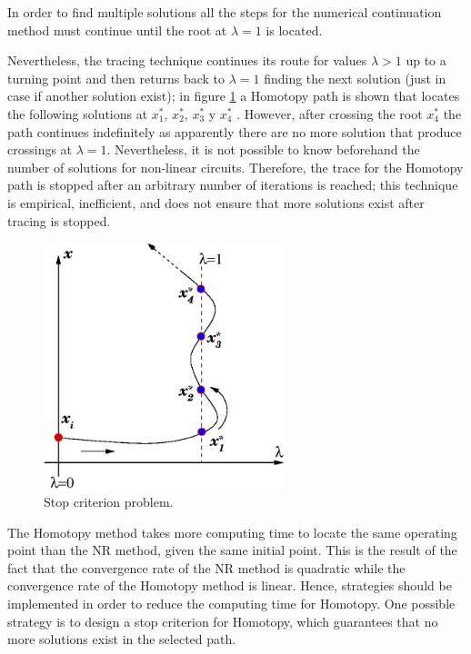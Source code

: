 \documentclass[conference,letterpaper,onecolumn]{IEEEtran}
\begin{document}
In order to find multiple solutions all the steps for the numerical continuation method \cite{homo_iberchip03,homo_allgower,homo_allgower2} must continue until the root at  $\lambda=1$ is located.

Nevertheless, the tracing technique continues its route for values $\lambda>1$ up to a turning point and then returns back to $\lambda=1$ finding the next solution (just in case if another solution exist); in figure \ref{procri} a Homotopy path is shown that locates the following solutions at $x^{*}_1$, $x^{*}_2$, $x^{*}_3$ y $x^{*}_4$ . However, after crossing the root $x^{*}_4$ the path continues indefinitely as apparently there are no more solution that produce crossings at $\lambda=1$. Nevertheless, it is not possible to know beforehand the number of solutions for non-linear circuits. Therefore, the trace for the Homotopy path is stopped after an arbitrary number of iterations is reached; this technique is empirical, inefficient, and does not ensure that more solutions exist after tracing is stopped.

\begin{figure}[hbtp]
\centering
\includegraphics[width=7cm]{figs/tray.eps}
\caption{Stop criterion problem.}
\label{procri}
\end{figure}

The Homotopy method takes more computing time to locate the same operating point than the NR method, given the same initial point. This is the result of the fact that the convergence rate of the NR method is quadratic while the convergence rate of the Homotopy method is linear. Hence, strategies should be implemented in order to reduce the computing time for Homotopy. One possible strategy is to design a stop criterion \cite{homo_iscas05} for Homotopy, which guarantees that no more solutions exist in the selected path.
\end{document}
